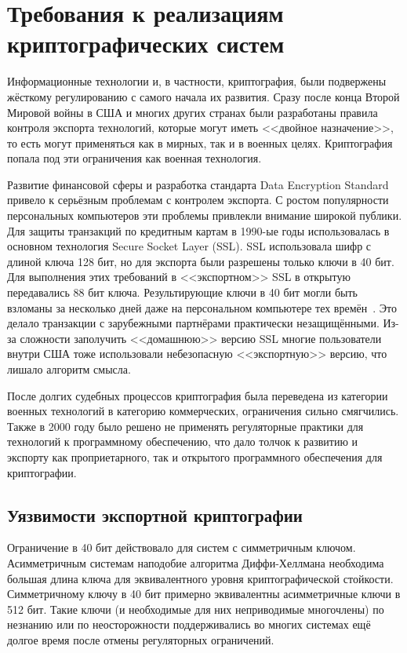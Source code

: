 \documentclass[times,specification,annotation]{itmo-student-thesis}
\begin{document}
\chapter{Требования к реализациям криптографических систем}

Информационные технологии и, в частности, криптография, были подвержены жёсткому регулированию с самого начала их развития.
Сразу после конца Второй Мировой войны в США и многих других странах были разработаны правила контроля экспорта
технологий, которые могут иметь <<двойное назначение>>, то есть могут применяться как в мирных, так и в военных целях.
Криптография попала под эти ограничения как военная технология.

Развитие финансовой сферы и разработка стандарта Data Encryption Standard привело к серьёзным проблемам с контролем экспорта.
С ростом популярности персональных компьютеров эти проблемы привлекли внимание широкой публики.
Для защиты транзакций по кредитным картам в 1990-ые годы использовалась в основном технология Secure Socket Layer (SSL).
SSL использовала шифр с длиной ключа 128 бит, но для экспорта были разрешены только ключи в 40 бит.
Для выполнения этих требований в <<экспортном>> SSL в открытую передавались 88 бит ключа.
Результирующие ключи в 40 бит могли быть взломаны за несколько дней даже на персональном компьютере тех времён~\cite{lev01}.
Это делало транзакции с зарубежными партнёрами практически незащищёнными.
Из-за сложности заполучить <<домашнюю>> версию SSL многие пользователи внутри США тоже использовали небезопасную
<<экспортную>> версию, что лишало алгоритм смысла.

После долгих судебных процессов криптография была переведена из категории военных технологий в категорию коммерческих,
ограничения сильно смягчились.
Также в 2000 году было решено не применять регуляторные практики для технологий к программному обеспечению,
что дало толчок к развитию и экспорту как проприетарного, так и открытого программного обеспечения для криптографии.

\section{Уязвимости экспортной криптографии}\label{sec:logjam}

Ограничение в 40 бит действовало для систем с симметричным ключом.
Асимметричным системам наподобие алгоритма Диффи-Хеллмана необходима большая длина ключа для эквивалентного уровня криптографической стойкости.
Симметричному ключу в 40 бит примерно эквивалентны асимметричные ключи в 512 бит.
Такие ключи (и необходимые для них неприводимые многочлены) по незнанию или по неосторожности поддерживались во многих системах ещё
долгое время после отмены регуляторных ограничений.
\end{document}
